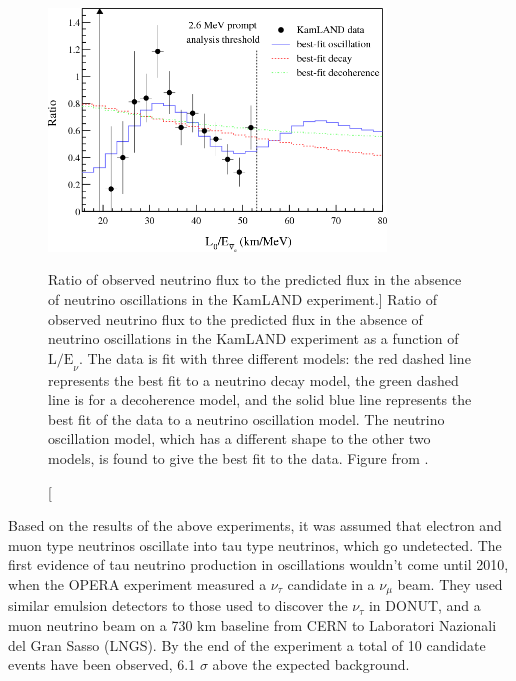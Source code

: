 \begin{figure}

	\centering

	\includegraphics[width=0.8\textwidth]{figures/kamland_spec.png}

	\caption
	[Ratio of observed neutrino flux to the predicted flux in the absence of
	neutrino oscillations in the KamLAND experiment.]
	{Ratio of observed neutrino flux to the predicted flux in the absence of
	neutrino oscillations in the KamLAND experiment as a function of 
	\(\mbox{L/E}_\nu\). The data is fit with three different models: the red 
	dashed line represents the best fit to a neutrino decay model, the green 
	dashed line is for a decoherence model, and the solid blue line represents the 
	best fit of the data to a neutrino oscillation model. The neutrino oscillation
	model, which has a different shape to the other two models, is found to give 
	the best fit to the data. Figure from \cite{Araki2005}.} 

	\label{fig:kamland_spectrum}

\end{figure}

Based on the results of the above experiments, it was assumed that electron and
muon type neutrinos oscillate into tau type neutrinos, which go undetected. 
The first evidence of tau neutrino production in oscillations wouldn't come 
until 2010, when the OPERA experiment measured a \(\nu_\tau\) candidate in a 
\(\nu_\mu\) beam. They used similar emulsion detectors to those used to 
discover the \(\nu_\tau\) in DONUT, and a muon neutrino beam on a 730 km 
baseline from CERN to Laboratori Nazionali del Gran Sasso (LNGS). By the end 
of the experiment a total of 10 candidate events have been observed, 6.1 
\(\sigma\) above the expected background\cite{Agafonova2010, Agafonova2018}.

